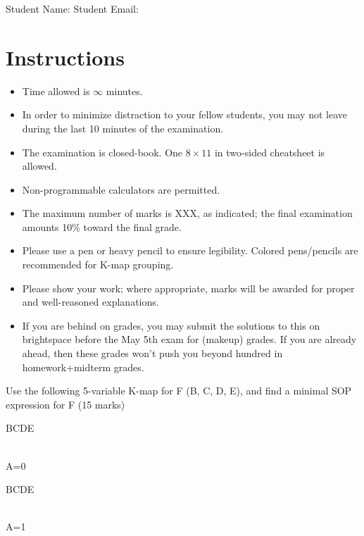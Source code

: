 \maketitle

Student Name: \hfill Student Email: \hspace{10em}
\section{Instructions}
\begin{itemize}
  \item Time allowed is $\infty$ minutes.
  \item In order to minimize distraction to your fellow students, you may not leave
  during the last 10 minutes of the examination.
  \item The examination is closed-book. One $8\times11$ in two-sided cheatsheet is allowed.
  \item Non-programmable calculators are permitted.
  \item The maximum number of marks is XXX, as indicated; the final examination
  amounts 10\% toward the final grade.
  \item Please use a pen or heavy pencil to ensure legibility. Colored
    pens/pencils are recommended for K-map grouping.
  \item Please show your work; where appropriate, marks will be awarded for proper and well-reasoned explanations.
  \item If you are behind on grades, you may submit the solutions to this on brightspace before the May 5th exam for (makeup) grades. If you are already ahead, then these grades won't push you beyond hundred in homework+midterm grades.
\end{itemize}

\begin{prob}
Use the following 5-variable K-map for F (B, C, D, E), and find
  a minimal SOP expression for F (15 marks)\\
\begin{minipage}{0.5\linewidth}
  \centering
  \begin{Karnaugh}{BC}{DE}
  \end{Karnaugh}\\
  A=0
\end{minipage}%
\begin{minipage}{0.5\linewidth}
  \centering
  \begin{Karnaugh}{BC}{DE}
  \end{Karnaugh}\\
  A=1
\end{minipage}
\end{prob}

